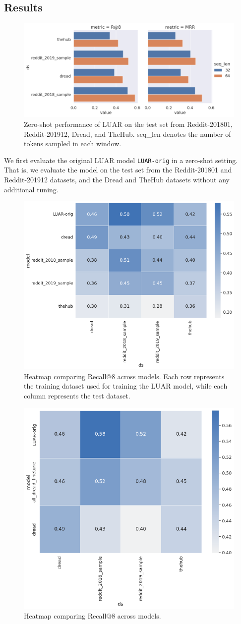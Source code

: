 \subsection{Results}
\begin{figure}
    \centering
    \includegraphics[width=0.9\linewidth]{stylometryExtensions/figures/results/rq1_zeroshot} 
    \caption{Zero-shot performance of LUAR on the test set from Reddit-201801, Reddit-201912, Dread, and TheHub. seq\_len denotes the number of tokens sampled in each window.}
    \label{fig:stylometry_extensions:followingTrail:results:rq1_zeroshot}   
\end{figure}

We first evaluate the original LUAR model \texttt{LUAR-orig} in a zero-shot setting.
That is, we evaluate the model on the test set from the Reddit-201801 and Reddit-201912 datasets, and the Dread and TheHub datasets without any additional tuning.


\begin{figure}
    \centering
    \includegraphics[width=0.5\linewidth]{stylometryExtensions/figures/results/rq2_trainedmodels} 
    \caption{Heatmap comparing Recall@8 across models. Each row represents the training dataset used for training the LUAR model, while each column represents the test dataset.}
    \label{fig:stylometry_extensions:followingTrail:results:rq2_trainedmodels}
\end{figure}


\begin{figure}
    \centering
    \includegraphics[width=0.5\linewidth]{stylometryExtensions/figures/results/rq3_combine} 
    \caption{Heatmap comparing Recall@8 across models. }
    \label{fig:stylometry_extensions:followingTrail:results:rq3_combine}
\end{figure}


\endinput